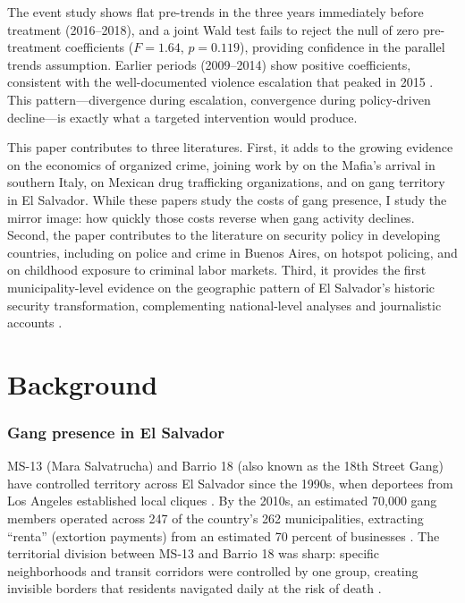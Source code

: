 \documentclass[12pt]{article}
\begin{document}
The event study shows flat pre-trends in the three years immediately before treatment (2016--2018), and a joint Wald test fails to reject the null of zero pre-treatment coefficients ($F = 1.64$, $p = 0.119$), providing confidence in the parallel trends assumption. Earlier periods (2009--2014) show positive coefficients, consistent with the well-documented violence escalation that peaked in 2015 \citep{Lessing2017}. This pattern---divergence during escalation, convergence during policy-driven decline---is exactly what a targeted intervention would produce.

This paper contributes to three literatures. First, it adds to the growing evidence on the economics of organized crime, joining work by \citet{Pinotti2015} on the Mafia's arrival in southern Italy, \citet{Dell2015} on Mexican drug trafficking organizations, and \citet{Melnikov2020} on gang territory in El Salvador. While these papers study the costs of gang presence, I study the mirror image: how quickly those costs reverse when gang activity declines. Second, the paper contributes to the literature on security policy in developing countries, including \citet{DiTella2004} on police and crime in Buenos Aires, \citet{Blattman2021} on hotspot policing, and \citet{Sviatschi2022} on childhood exposure to criminal labor markets. Third, it provides the first municipality-level evidence on the geographic pattern of El Salvador's historic security transformation, complementing national-level analyses \citep{WorldBank2024} and journalistic accounts \citep{Lemus2021}.

\section{Background}

\subsubsection*{Gang presence in El Salvador} MS-13 (Mara Salvatrucha) and Barrio 18 (also known as the 18th Street Gang) have controlled territory across El Salvador since the 1990s, when deportees from Los Angeles established local cliques \citep{Cruz2017}. By the 2010s, an estimated 70,000 gang members operated across 247 of the country's 262 municipalities, extracting ``renta'' (extortion payments) from an estimated 70 percent of businesses \citep{WorldBank2018}. The territorial division between MS-13 and Barrio 18 was sharp: specific neighborhoods and transit corridors were controlled by one group, creating invisible borders that residents navigated daily at the risk of death \citep{Melnikov2020}.
\end{document}
